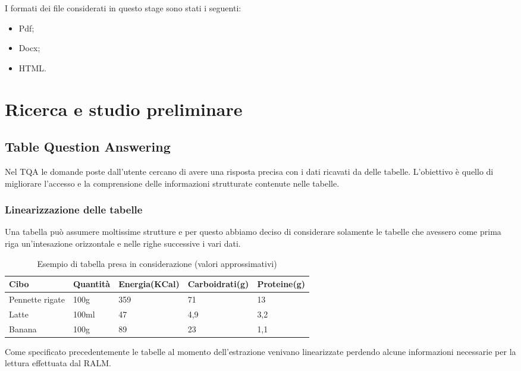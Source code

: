 I formati dei file considerati in questo stage sono stati i seguenti:
\begin{itemize}
    \item Pdf;
    \item Docx;
    \item HTML.
\end{itemize}

\section{Ricerca e studio preliminare}
\subsection{Table Question Answering}
Nel \gls{TQA} le domande poste dall'utente cercano di avere una risposta precisa con i dati ricavati da delle tabelle.
L'obiettivo è quello di migliorare l'accesso e la comprensione delle informazioni strutturate contenute nelle tabelle.

\subsubsection{Linearizzazione delle tabelle}
\label{subsubsec-lin-tab}
Una tabella può assumere moltissime strutture e per questo abbiamo deciso di considerare solamente le tabelle che avessero come prima riga 
un'intesazione orizzontale e nelle righe successive i vari dati.

\begin{table}[H]
    \centering
    \begin{tabular}{|p{3cm} |p{2cm} |p{2cm}| p{2cm}| p{2cm}|}
        \hline
        Cibo & Quantità & Energia(KCal) & Carboidrati(g) & Proteine(g) \\
        \hline
        Pennette rigate & 100g & 359 & 71 & 13 \\
        \hline
        Latte & 100ml & 47 & 4,9 & 3,2 \\
        \hline
        Banana & 100g & 89 & 23 & 1,1 \\
        \hline
    \end{tabular}
    \caption{Esempio di tabella presa in considerazione (valori approssimativi)}
    \label{tab:esempio-cibo}
\end{table}
\noindent Come specificato precedentemente le tabelle al momento dell'estrazione venivano linearizzate 
perdendo alcune informazioni necessarie per la lettura effettuata dal RALM. 

